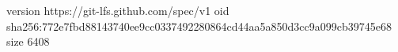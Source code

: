 version https://git-lfs.github.com/spec/v1
oid sha256:772e7fbd88143740ee9cc0337492280864cd44aa5a850d3cc9a099cb39745e68
size 6408
